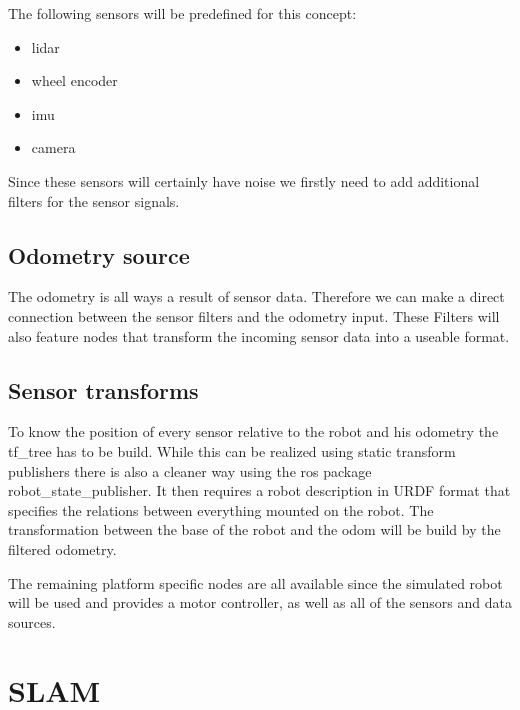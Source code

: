 The following sensors will be predefined for this concept:

\begin{itemize}
	\item lidar
	\item wheel encoder
	\item imu
	\item camera
\end{itemize}

Since these sensors will certainly have noise we firstly need to add additional filters for the sensor signals. 



\subsection{Odometry source}
The odometry is all ways a result of sensor data. Therefore we can make a direct connection between the sensor filters and the odometry input. These Filters will also feature nodes that transform the incoming sensor data into a useable format.

\subsection{Sensor transforms}
To know the position of every sensor relative to the robot and his odometry the tf\_tree has to be build. While this can be realized using static transform publishers there is also a cleaner way using the ros package robot\_state\_publisher. It then requires a robot description in URDF format that specifies the relations between everything mounted on the robot.
The transformation between the base of the robot and the odom will be build by the filtered odometry.

The remaining platform specific nodes are all available since the simulated robot will be used and provides a motor controller, as well as all of the sensors and data sources.

\section{SLAM}

